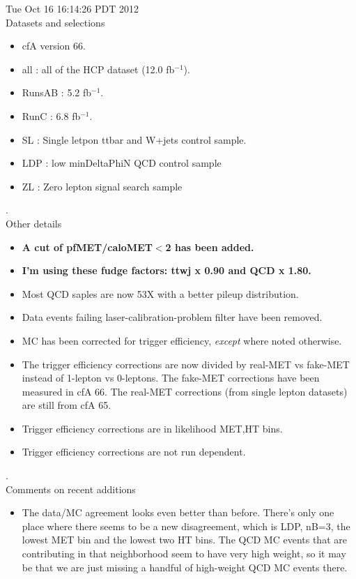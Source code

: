 \documentclass[11pt]{article}
\begin{document}
   Tue Oct 16 16:14:26 PDT 2012 \\

   Datasets and selections
   \begin{itemize}
     \item cfA version 66.
     \item all : all of the HCP dataset (12.0 fb$^{-1}$).
     \item RunsAB : 5.2 fb$^{-1}$.
     \item RunC : 6.8 fb$^{-1}$.
     \item SL : Single letpon ttbar and W+jets control sample.
     \item LDP : low minDeltaPhiN QCD control sample
     \item ZL : Zero lepton signal search sample
   \end{itemize}

.\\

   Other details
   \begin{itemize}
     \item {\bf A cut of pfMET/caloMET$<$2 has been added.}
     \item {\bf I'm using these fudge factors: ttwj x 0.90 and QCD x 1.80.}
     \item Most QCD saples are now 53X with a better pileup distribution.
     \item Data events failing laser-calibration-problem filter have been removed.
     \item MC has been corrected for trigger efficiency, {\it except} where noted otherwise.
     \item  The trigger efficiency corrections are now divided by real-MET vs fake-MET
             instead of 1-lepton vs 0-leptons.  The fake-MET corrections have been
             measured in cfA 66.  The real-MET corrections (from single lepton datasets)
             are still from cfA 65.
     \item Trigger efficiency corrections are in likelihood MET,HT bins.
     \item Trigger efficiency corrections are not run dependent.
   \end{itemize}

.\\

  Comments on recent additions
  \begin{itemize}
    \item The data/MC agreement looks even better than before.  There's only
           one place where there seems to be a new disagreement, which
           is LDP, nB=3, the lowest MET bin and the lowest two HT bins.
           The QCD MC events that are contributing in that neighborhood seem
           to have very high weight, so it may be that we are just missing a
           handful of high-weight QCD MC events there.
   \end{itemize}
\end{document}
